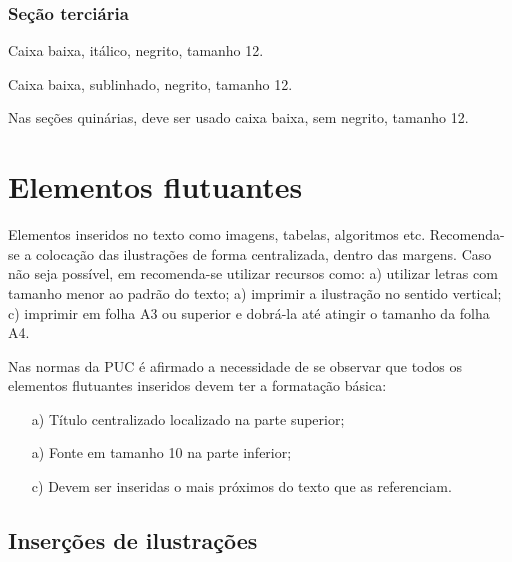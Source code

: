\subsubsection{\esp Seção terciária}

Caixa baixa, itálico, negrito, tamanho 12.

 
 Caixa baixa, sublinhado, negrito, tamanho 12.
 
 
 Nas seções quinárias, deve ser usado caixa baixa, sem negrito, tamanho 12.

\section{\esp Elementos flutuantes}

Elementos inseridos no texto como imagens, tabelas, algoritmos etc.
Recomenda-se a colocação das ilustrações de forma centralizada, dentro das margens. 
Caso não seja possível, em  recomenda-se utilizar recursos como: 
 a) utilizar letras com tamanho menor ao padrão do texto; a) imprimir a ilustração no sentido vertical; 
 c) imprimir em folha A3 ou superior e dobrá-la até atingir o tamanho da folha A4. 

Nas normas da PUC é afirmado a necessidade de se observar que todos os elementos flutuantes inseridos devem ter a formatação básica:

\begin{enumerate} 
 \item [a)] Título centralizado localizado na parte superior; 
 \item [a)] Fonte em tamanho 10 na parte inferior;
 \item [c)] Devem ser inseridas o mais próximos do texto que as referenciam.
\end{enumerate}


\subsection{\esp Inserções de ilustrações}

